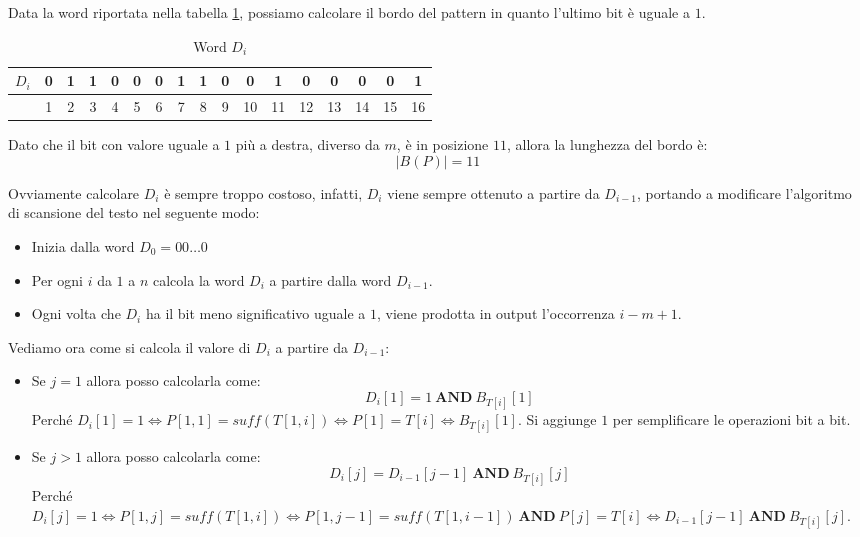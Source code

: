 \begin{esempio}
    Data la word riportata nella tabella \ref{tab:word}, possiamo calcolare il
    bordo del pattern in quanto l'ultimo bit è uguale a $1$.
    \begin{table}[!ht]
        \centering
        \begin{tabular}{|c|c|c|c|c|c|c|c|c|c|c|c|c|c|c|c|c|}
            \hline
            $D_i$ & 0 & 1 & 1 & 0 & 0 & 0 & 1 & 1 & 0 & 0  & 1  & 0  & 0  & 0  & 0  & 1  \\ \hline
                  & 1 & 2 & 3 & 4 & 5 & 6 & 7 & 8 & 9 & 10 & 11 & 12 & 13 & 14 & 15 & 16 \\ \hline
        \end{tabular}
        \caption{Word $D_i$}
        \label{tab:word}
    \end{table}

    Dato che il bit con valore uguale a $1$ più a destra, diverso da $m$, è in
    posizione $11$, allora la lunghezza del bordo è:
    \begin{equation}
        |B(P)| = 11
    \end{equation}
\end{esempio}
Ovviamente calcolare $D_i$ è sempre troppo costoso, infatti, $D_i$ viene sempre
ottenuto a partire da $D_{i - 1}$, portando a modificare l'algoritmo di scansione
del testo nel seguente modo:
\begin{itemize}
    \item Inizia dalla word $D_0 = 00\dots0$
    \item Per ogni $i$ da $1$ a $n$ calcola la word $D_i$ a partire dalla word
          $D_{i - 1}$.
    \item Ogni volta che $D_i$ ha il bit meno significativo uguale a $1$, viene
          prodotta in output l'occorrenza $i - m + 1$.
\end{itemize}
Vediamo ora come si calcola il valore di $D_i$ a partire da $D_{i - 1}$:
\begin{itemize}
    \item Se $j =  1$ allora posso calcolarla come:
          \begin{equation}
              D_i[1] = 1 \ \textbf{AND} \ B_{T[i]}[1]
          \end{equation}
          Perché $D_i[1] = 1 \iff P[1,1] = suff(T[1,i]) \iff P[1] = T[i] \iff
              B_{T[i]}[1]$. Si aggiunge $1$ per semplificare le operazioni bit
          a bit.
    \item Se $j > 1$ allora posso calcolarla come:
          \begin{equation}
              D_i[j] = D_{i - 1}[j - 1] \ \textbf{AND} \ B_{T[i]}[j]
          \end{equation}
          Perché $D_i[j] = 1 \iff P[1,j] = suff(T[1,i]) \iff P[1,j - 1] =
              suff(T[1,i - 1]) \ \textbf{AND} \ P[j] = T[i] \iff D_{i - 1}[j - 1]
              \ \textbf{AND} \ B_{T[i]}[j]$.
\end{itemize}
